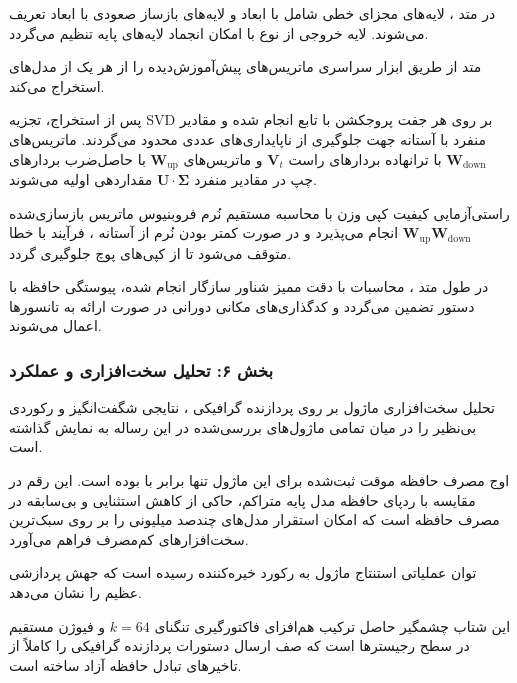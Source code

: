 در متد ، لایه‌های مجزای خطی شامل  با ابعاد  و لایه‌های بازساز صعودی  با ابعاد  تعریف می‌شوند. لایه خروجی از نوع  با امکان انجماد لایه‌های پایه تنظیم می‌گردد.

متد  از طریق ابزار سراسری  ماتریس‌های پیش‌آموزش‌دیده را از هر یک از مدل‌های  استخراج می‌کند.

پس از استخراج، تجزیه SVD بر روی هر جفت پروجکشن با تابع  انجام شده و مقادیر منفرد با آستانه  جهت جلوگیری از ناپایداری‌های عددی محدود  می‌گردند. ماتریس‌های $\mathbf{W}_{\text{down}}$ با ترانهاده بردارهای راست $\mathbf{V}_t$ و ماتریس‌های $\mathbf{W}_{\text{up}}$ با حاصل‌ضرب بردارهای چپ در مقادیر منفرد $\mathbf{U} \cdot \mathbf{\Sigma}$ مقداردهی اولیه می‌شوند.

راستی‌آزمایی کیفیت کپی وزن با محاسبه مستقیم نُرم فروبنیوس ماتریس بازسازی‌شده $\mathbf{W}_{\text{up}} \mathbf{W}_{\text{down}}$ انجام می‌پذیرد و در صورت کمتر بودن نُرم از آستانه ، فرآیند با خطا متوقف می‌شود تا از کپی‌های پوچ جلوگیری گردد.

در طول متد ، محاسبات با دقت ممیز شناور سازگار انجام شده، پیوستگی حافظه با دستور  تضمین می‌گردد و کدگذاری‌های مکانی دورانی  در صورت ارائه به تانسورها اعمال می‌شوند.

\subsubsection*{بخش ۶: تحلیل سخت‌افزاری و عملکرد }
تحلیل سخت‌افزاری ماژول  بر روی پردازنده گرافیکی ، نتایجی شگفت‌انگیز و رکوردی بی‌نظیر را در میان تمامی ماژول‌های بررسی‌شده در این رساله به نمایش گذاشته است.

اوج مصرف حافظه موقت  ثبت‌شده برای این ماژول تنها برابر با  بوده است. این رقم در مقایسه با ردپای حافظه  مدل پایه متراکم، حاکی از کاهش استثنایی و بی‌سابقه  در مصرف حافظه است که امکان استقرار مدل‌های چندصد میلیونی را بر روی سبک‌ترین سخت‌افزارهای کم‌مصرف فراهم می‌آورد.

توان عملیاتی استنتاج ماژول به رکورد خیره‌کننده  رسیده است که جهش پردازشی عظیم   را نشان می‌دهد.

این شتاب چشمگیر حاصل ترکیب هم‌افزای فاکتورگیری تنگنای $k=64$ و فیوژن مستقیم در سطح رجیسترها است که صف ارسال دستورات پردازنده گرافیکی را کاملاً از تاخیرهای تبادل حافظه آزاد ساخته است.

